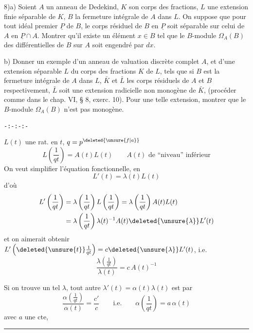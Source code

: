 8)\qquad a) Soient $A$ un anneau de Dedekind, $K$ son corps des fractions, $L$ une extension finie séparable de $K$, $B$ la fermeture intégrale de $A$ dans $L$. On suppose que pour tout idéal premier $\underline{P}$ de $B$, le corps résiduel de $B$ en $\underline{P}$ soit séparable sur celui de $A$ en $\underline{P}\cap A$. Montrer qu'il existe un élément $x\in B$ tel que le $B$-module $\Omega_A(B)$ des différentielles de $B$ sur $A$ soit engendré par $dx$.

b) Donner un exemple d'un anneau de valuation discrète complet $A$, et d'une extension séparable $L$ du corps des fractions $K$ de $L$, tels que si $B$ est la fermeture intégrale de $A$ dans $L$, $\bar K$ et $\bar L$ les corps résiduels de $A$ et $B$ respectivement, $\bar L$ soit une extension radicielle non monogène de $\bar K$, (procéder comme dans le chap. VI, § 8, exerc. 10). Pour une telle extension, montrer que le $B$-module $\Omega_A(B)$ n'est pas monogène.

\begin{center}\texttt{-:-:-:-}\end{center}

$L(t)$ une  rat. en $t$,  $q=p^{\deleted{\unsure{f|a}}}$
\[
L\left(\frac{1}{qt}\right)=A(t)L(t) \qquad A(t)\text{ de ``niveau'' inférieur}
\]
On veut simplifier l'équation fonctionnelle, en 
\[
L'(t)=\lambda(t)L(t)
\]
d'où
\[
\begin{aligned}
L'\left(\frac{1}{qt}\right)&=\lambda\left(\frac{1}{qt}\right)L\left(\frac{1}{qt}\right)=\lambda\left(\frac{1}{qt}\right)A(t)L(t)\\
&=\lambda\left(\frac{1}{qt}\right)\lambda(t)^{-1}A(t)\deleted{\unsure{\lambda}}L'(t)
\end{aligned}
\]
et on aimerait obtenir $L'\left(\deleted{\unsure{t}}\frac{1}{qt}\right)=c\deleted{\unsure{\lambda}}L'(t)$, i.e.
\[
\frac{\lambda\left(\frac{1}{qt}\right)}{\lambda(t)}=c\,A(t)^{-1}
\]

Si on trouve un tel $\lambda$, tout autre $\lambda'(t)=\alpha(t)\lambda(t)$  est  par \unsure{$\alpha$} 
\[
\frac{\alpha\left(\frac{1}{qt}\right)}{\alpha(t)}=\frac{c'}{c}\qquad \text{i.e.}\qquad \alpha\left(\frac{1}{qt}\right)=a\,\alpha(t)
\]
avec $a$ une $\mathrm{cte}$, 
\par\noindent\rule{.72\linewidth}{.3pt}

